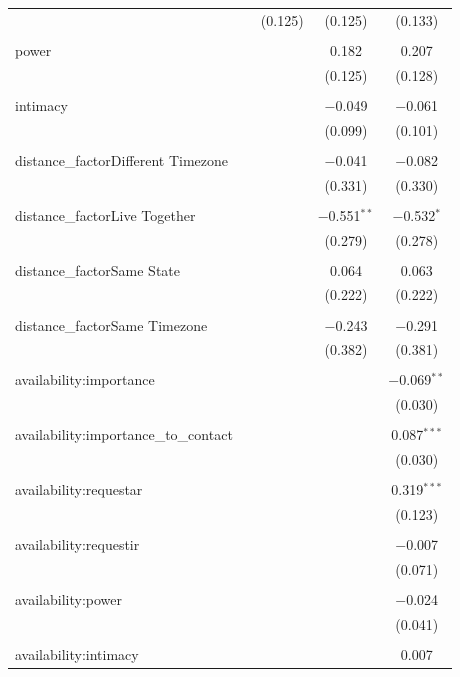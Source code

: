 \documentclass[12pt]{nuthesis}	%
\begin{document}
\begin{table}[!htbp]
\begin{tabular}{@{\extracolsep{5pt}}lcccc}
  &  & (0.125) & (0.125) & (0.133) \\ 
  & & & & \\ 
 power &  &  & 0.182 & 0.207 \\ 
  &  &  & (0.125) & (0.128) \\ 
  & & & & \\ 
 intimacy &  &  & $-$0.049 & $-$0.061 \\ 
  &  &  & (0.099) & (0.101) \\ 
  & & & & \\ 
 distance\_factorDifferent Timezone &  &  & $-$0.041 & $-$0.082 \\ 
  &  &  & (0.331) & (0.330) \\ 
  & & & & \\ 
 distance\_factorLive Together &  &  & $-$0.551$^{**}$ & $-$0.532$^{*}$ \\ 
  &  &  & (0.279) & (0.278) \\ 
  & & & & \\ 
 distance\_factorSame State &  &  & 0.064 & 0.063 \\ 
  &  &  & (0.222) & (0.222) \\ 
  & & & & \\ 
 distance\_factorSame Timezone &  &  & $-$0.243 & $-$0.291 \\ 
  &  &  & (0.382) & (0.381) \\ 
  & & & & \\ 
 availability:importance &  &  &  & $-$0.069$^{**}$ \\ 
  &  &  &  & (0.030) \\ 
  & & & & \\ 
 availability:importance\_to\_contact &  &  &  & 0.087$^{***}$ \\ 
  &  &  &  & (0.030) \\ 
  & & & & \\ 
 availability:requestar &  &  &  & 0.319$^{***}$ \\ 
  &  &  &  & (0.123) \\ 
  & & & & \\ 
 availability:requestir &  &  &  & $-$0.007 \\ 
  &  &  &  & (0.071) \\ 
  & & & & \\ 
 availability:power &  &  &  & $-$0.024 \\ 
  &  &  &  & (0.041) \\ 
  & & & & \\ 
 availability:intimacy &  &  &  & 0.007 \\ 

\end{tabular}
\end{table}
\end{document}
